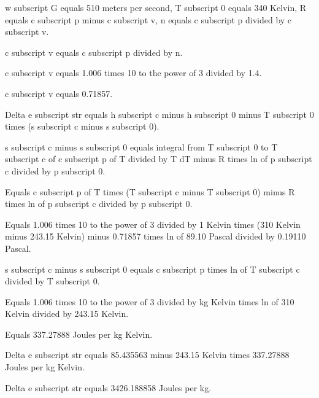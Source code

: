 w subscript G equals 510 meters per second, T subscript 0 equals 340 Kelvin, R equals c subscript p minus c subscript v, n equals c subscript p divided by c subscript v.  

c subscript v equals c subscript p divided by n.  

c subscript v equals 1.006 times 10 to the power of 3 divided by 1.4.  

c subscript v equals 0.71857.  

Delta e subscript str equals h subscript c minus h subscript 0 minus T subscript 0 times (s subscript c minus s subscript 0).  

s subscript c minus s subscript 0 equals integral from T subscript 0 to T subscript c of c subscript p of T divided by T dT minus R times ln of p subscript c divided by p subscript 0.  

Equals c subscript p of T times (T subscript c minus T subscript 0) minus R times ln of p subscript c divided by p subscript 0.  

Equals 1.006 times 10 to the power of 3 divided by 1 Kelvin times (310 Kelvin minus 243.15 Kelvin) minus 0.71857 times ln of 89.10 Pascal divided by 0.19110 Pascal.  

s subscript c minus s subscript 0 equals c subscript p times ln of T subscript c divided by T subscript 0.  

Equals 1.006 times 10 to the power of 3 divided by kg Kelvin times ln of 310 Kelvin divided by 243.15 Kelvin.  

Equals 337.27888 Joules per kg Kelvin.  

Delta e subscript str equals 85.435563 minus 243.15 Kelvin times 337.27888 Joules per kg Kelvin.  

Delta e subscript str equals 3426.188858 Joules per kg.